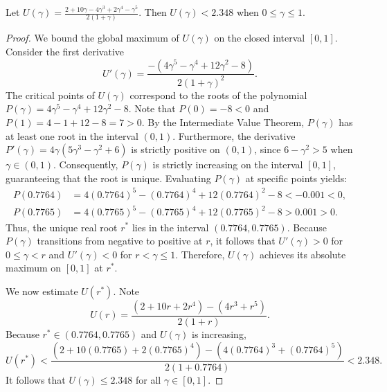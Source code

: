 \documentclass[11pt]{amsart}
\begin{document}
\begin{lemma}\label{gamma-bound} 
Let $U(\gamma)=\frac{2 + 10\gamma - 4\gamma^3 + 2\gamma^4 - \gamma^5}{2(1+\gamma)}$. Then $U(\gamma) <2.348$ when $0\le \gamma \le 1$. 
\end{lemma}
\begin{proof}
 We bound the global maximum of $U(\gamma)$ on the closed interval $[0, 1]$. Consider the first derivative
\[ U'(\gamma) = \frac{-(4\gamma^5 - \gamma^4 + 12\gamma^2 - 8)}{2(1+\gamma)^2}. \]
The critical points of $U(\gamma)$ correspond to the roots of the polynomial $P(\gamma) = 4\gamma^5 - \gamma^4 + 12\gamma^2 - 8$. Note that $P(0) = -8 <0$ and $P(1) = 4 - 1 + 12 - 8 = 7 > 0$. By the Intermediate Value Theorem,  $P(\gamma)$ has at least one root in the interval $(0, 1)$. Furthermore, the derivative $P'(\gamma) = 4\gamma(5\gamma^3 - \gamma^2 + 6)$ is strictly positive on $(0, 1)$, since $6 - \gamma^2 > 5$ when $\gamma\in (0,1)$. Consequently, $P(\gamma)$ is strictly increasing on the interval $[0, 1]$, guaranteeing that the root is unique. Evaluating $P(\gamma)$ at specific points yields:
\begin{equation*}
\begin{aligned}
P(0.7764) &=4(0.7764)^5 - (0.7764)^4 + 12(0.7764)^2 - 8 < -0.001 < 0, \\
P(0.7765) &= 4(0.7765)^5 - (0.7765)^4 + 12(0.7765)^2 - 8 > 0.001>0.
\end{aligned}
\end{equation*}
Thus, the unique real root $r^*$ lies in the interval $(0.7764, 0.7765)$. %
Because $P(\gamma)$ transitions from negative to positive at $r$, it follows that $U'(\gamma) > 0$ for $0\le \gamma < r$ and $U'(\gamma) < 0$ for $r<\gamma\le 1$. Therefore, $U(\gamma)$ achieves its absolute maximum on $[0, 1]$ at $r^*$.

We now estimate $U(r^*)$. Note \[ U(r) = \frac{(2 + 10r + 2r^4) - (4r^3 + r^5)}{2(1+r)}. \]
Because $r^* \in (0.7764, 0.7765)$ %
and $U(\gamma)$ is increasing, 
\[ U(r^*) < \frac{(2 + 10(0.7765) + 2(0.7765)^4) - (4(0.7764)^3 + (0.7764)^5)}{2(1+0.7764)}  < 2.348. \]
It follows that $U(\gamma) \le 2.348$ for all $\gamma \in [0, 1]$.  
\end{proof}
\end{document}
